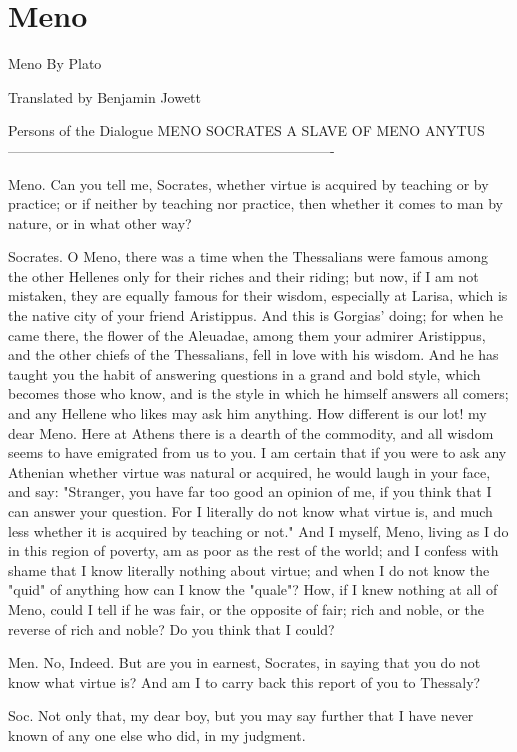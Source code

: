 \chapter{Meno} %
\label{cha:meno}


Meno
By Plato


Translated by Benjamin Jowett

Persons of the Dialogue
MENO
SOCRATES
A SLAVE OF MENO
ANYTUS
----------------------------------------------------------------------

Meno. Can you tell me, Socrates, whether virtue is acquired by teaching
or by practice; or if neither by teaching nor practice, then whether
it comes to man by nature, or in what other way? 

Socrates. O Meno, there was a time when the Thessalians were famous
among the other Hellenes only for their riches and their riding; but
now, if I am not mistaken, they are equally famous for their wisdom,
especially at Larisa, which is the native city of your friend Aristippus.
And this is Gorgias' doing; for when he came there, the flower of
the Aleuadae, among them your admirer Aristippus, and the other chiefs
of the Thessalians, fell in love with his wisdom. And he has taught
you the habit of answering questions in a grand and bold style, which
becomes those who know, and is the style in which he himself answers
all comers; and any Hellene who likes may ask him anything. How different
is our lot! my dear Meno. Here at Athens there is a dearth of the
commodity, and all wisdom seems to have emigrated from us to you.
I am certain that if you were to ask any Athenian whether virtue was
natural or acquired, he would laugh in your face, and say: "Stranger,
you have far too good an opinion of me, if you think that I can answer
your question. For I literally do not know what virtue is, and much
less whether it is acquired by teaching or not." And I myself, Meno,
living as I do in this region of poverty, am as poor as the rest of
the world; and I confess with shame that I know literally nothing
about virtue; and when I do not know the "quid" of anything how can
I know the "quale"? How, if I knew nothing at all of Meno, could I
tell if he was fair, or the opposite of fair; rich and noble, or the
reverse of rich and noble? Do you think that I could? 

Men. No, Indeed. But are you in earnest, Socrates, in saying that
you do not know what virtue is? And am I to carry back this report
of you to Thessaly? 

Soc. Not only that, my dear boy, but you may say further that I have
never known of any one else who did, in my judgment. 

